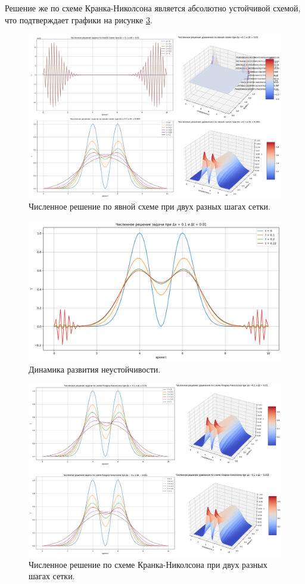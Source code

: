 \documentclass[diploma]{nanolab2015}
\begin{document}
Решение же по схеме Кранка-Николсона является абсолютно устойчивой схемой, что подтверждает графики на рисунке \ref{pic3}.

\begin{figure}[h!]
\centering
\includegraphics[scale=0.3]{j 1.jpg}
\caption{\label{pic2}  Численное решение по явной схеме при двух разных шагах сетки.}
\end{figure}

\begin{figure}[h!]
\centering
\includegraphics[scale=0.54]{neust.png}
\caption{\label{pic4}  Динамика развития неустойчивости.}
\end{figure}


\begin{figure}[h!]
\centering
\includegraphics[scale=0.3]{n 1.jpg}
\caption{\label{pic3}  Численное решение по схеме Кранка-Николсона при двух разных шагах сетки.}
\end{figure}
\end{document}
